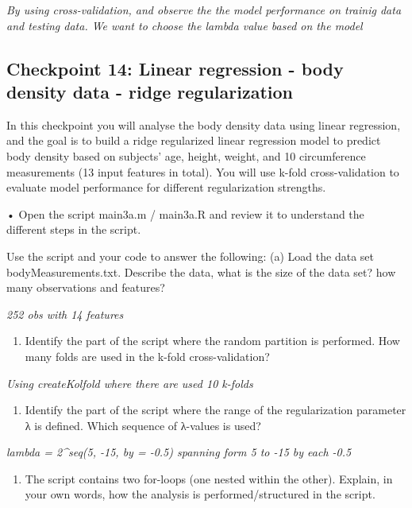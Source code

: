 \documentclass[
  letterpaper,
  DIV=11,
  numbers=noendperiod]{scrartcl}
\providecommand{\tightlist}{%
  \setlength{\itemsep}{0pt}\setlength{\parskip}{0pt}}\usepackage{longtable,booktabs,array}
\begin{document}
\emph{By using cross-validation, and observe the the model performance
on trainig data and testing data. We want to choose the lambda value
based on the model }

\hypertarget{checkpoint-14-linear-regression---body-density-data---ridge-regularization}{%
\subsection{Checkpoint 14: Linear regression - body density data - ridge
regularization}\label{checkpoint-14-linear-regression---body-density-data---ridge-regularization}}

In this checkpoint you will analyse the body density data using linear
regression, and the goal is to build a ridge regularized linear
regression model to predict body density based on subjects' age, height,
weight, and 10 circumference measurements (13 input features in total).
You will use k-fold cross-validation to evaluate model performance for
different regularization strengths.

• Open the script main3a.m / main3a.R and review it to understand the
different steps in the script.

Use the script and your code to answer the following: (a) Load the data
set bodyMeasurements.txt. Describe the data, what is the size of the
data set? how many observations and features?

\emph{252 obs with 14 features}

\begin{enumerate}
\def\labelenumi{(\alph{enumi})}
\setcounter{enumi}{1}
\tightlist
\item
  Identify the part of the script where the random partition is
  performed. How many folds are used in the k-fold cross-validation?
\end{enumerate}

\emph{Using createKolfold where there are used 10 k-folds}

\begin{enumerate}
\def\labelenumi{(\alph{enumi})}
\setcounter{enumi}{2}
\tightlist
\item
  Identify the part of the script where the range of the regularization
  parameter λ is defined. Which sequence of λ-values is used?
\end{enumerate}

\emph{lambda = 2\^{}seq(5, -15, by = -0.5) spanning form 5 to -15 by
each -0.5}

\begin{enumerate}
\def\labelenumi{(\alph{enumi})}
\setcounter{enumi}{3}
\tightlist
\item
  The script contains two for-loops (one nested within the other).
  Explain, in your own words, how the analysis is performed/structured
  in the script.
\end{enumerate}
\end{document}
